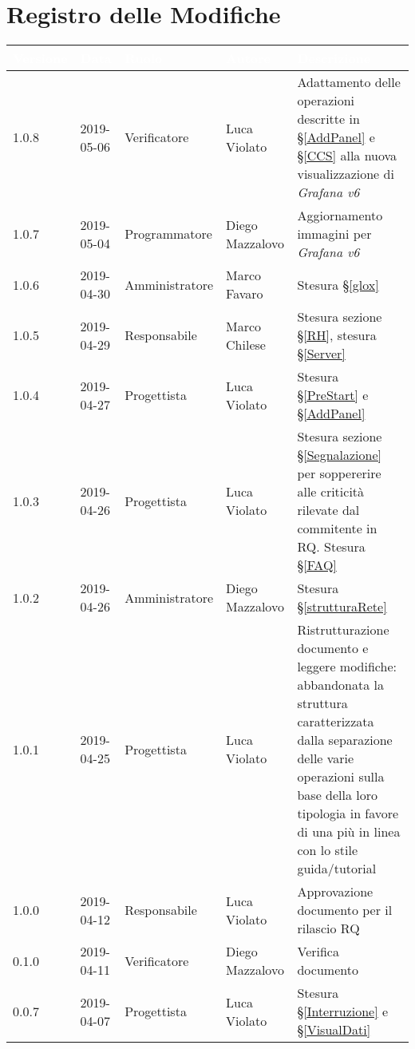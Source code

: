 \section*{Registro delle Modifiche}

\begin{center}
\begin{longtable}[c]{|m{}|m{}|m{}|m{}|p{}|}
\hline
\rowcolor{bluelogo}\textbf{\textcolor{white}{Versione}} & \textbf{\textcolor{white}{Data}} & \textbf{\textcolor{white}{Ruolo}} & \textbf{\textcolor{white}{Autore}} & \textbf{\textcolor{white}{Descrizione}} \\
\hline \hline
\endhead
1.0.8 & 2019-05-06 & Verificatore & Luca Violato & Adattamento delle operazioni descritte in §\ref{AddPanel} e §\ref{CCS} alla nuova visualizzazione di \textit{Grafana v6}\\
\hline
\rowcolor{grigio}1.0.7 & 2019-05-04 & Programmatore & Diego Mazzalovo & Aggiornamento immagini per \textit{Grafana v6}\\
\hline
1.0.6 & 2019-04-30 & Amministratore & Marco Favaro & Stesura §\ref{glox}\\
\hline
\rowcolor{grigio}1.0.5 & 2019-04-29 & Responsabile & Marco Chilese & Stesura sezione §\ref{RH}, stesura §\ref{Server}\\
\hline
1.0.4 & 2019-04-27 & Progettista & Luca Violato & Stesura §\ref{PreStart} e §\ref{AddPanel}\\
\hline
\rowcolor{grigio}1.0.3 & 2019-04-26 & Progettista & Luca Violato & Stesura sezione §\ref{Segnalazione} per soppererire alle criticità rilevate dal commitente in RQ. Stesura §\ref{FAQ}\\
\hline
1.0.2 & 2019-04-26 & Amministratore & Diego Mazzalovo & Stesura §\ref{strutturaRete}\\
\hline
\rowcolor{grigio}1.0.1 & 2019-04-25 & Progettista & Luca Violato & Ristrutturazione documento e leggere modifiche: abbandonata la struttura caratterizzata dalla separazione delle varie operazioni sulla base della loro tipologia in favore di una più in linea con lo stile guida/tutorial\\
\hline
1.0.0 & 2019-04-12 & Responsabile & Luca Violato & Approvazione documento per il rilascio RQ \\
\hline
\rowcolor{grigio}0.1.0 & 2019-04-11 & Verificatore & Diego Mazzalovo & Verifica documento \\
\hline
0.0.7 & 2019-04-07 & Progettista & Luca Violato & Stesura §\ref{Interruzione} e §\ref{VisualDati}\\

\end{longtable}
\end{center}

